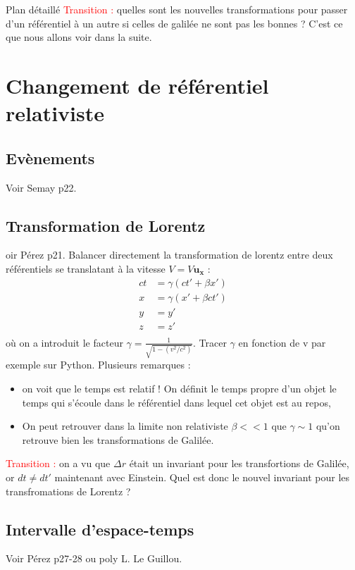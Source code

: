 \begin{reportBlock}{Plan détaillé}
\textcolor{red}{Transition :} quelles sont les nouvelles transformations pour passer d'un référentiel à un autre si celles de galilée ne sont pas les bonnes ? C'est ce que nous allons voir dans la suite.

\section{Changement de référentiel relativiste}

\subsection{Evènements}
Voir Semay p22. 

\subsection{Transformation de Lorentz}
oir Pérez p21. Balancer directement la transformation de lorentz entre deux référentiels se translatant à la vitesse $V=V\mathbf{u_x}$ :
\begin{align}
    ct &= \gamma(ct'+\beta x') \\
    x &= \gamma(x' +\beta ct') \\
    y &= y' \\
    z &= z' \\
\end{align}
où on a introduit le facteur $\gamma = \frac{1}{\sqrt{1-(v^2/c^2)}}$. Tracer $\gamma$ en fonction de v par exemple sur Python. 
Plusieurs remarques : 
\begin{itemize}
    \item on voit que le temps est relatif ! On définit le temps propre d'un objet le temps qui s'écoule dans le référentiel dans lequel cet objet est au repos,
    \item On peut retrouver dans la limite non relativiste $\beta<<1$ que $\gamma\sim1$ qu'on retrouve bien les transformations de Galilée.
\end{itemize}

\textcolor{red}{Transition :} on a vu que $\Delta r$ était un invariant pour les transfortions de Galilée, or $dt\ne dt'$ maintenant avec Einstein. Quel est donc le nouvel invariant pour les transfromations de Lorentz ?

\subsection{Intervalle d'espace-temps}
Voir Pérez p27-28 ou poly L. Le Guillou.\\


\end{reportBlock}
